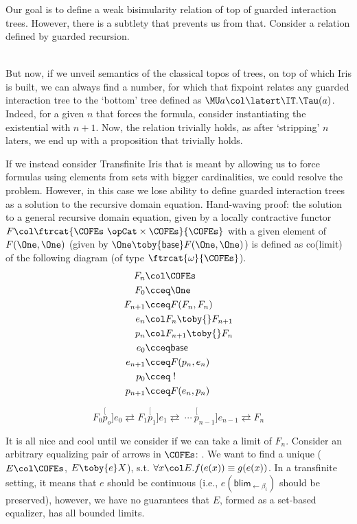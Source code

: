 Our goal is to define a weak bisimularity relation of top of guarded
interaction trees. However, there is a subtlety that prevents us from
that. Consider a relation defined by guarded recursion.

\begin{align*}
\end{align*}

But now, if we unveil semantics of the classical topos of trees,
on top of which Iris is built, we can always find a number, for
which that fixpoint relates any guarded interaction tree to
the `bottom' tree defined as $\MU a \col \latert \IT. \Tau(a)$.
Indeed, for a given $n$ that forces the formula, consider instantiating
the existential with $n + 1$. Now, the relation trivially holds, as after
`stripping' $n$ laters, we end up with a proposition that trivially holds.

If we instead consider Transfinite Iris that is meant by allowing us to
force formulas using elements from sets with bigger cardinalities, we
could resolve the problem. However, in this case we lose ability
to define guarded interaction trees as a solution to the recursive domain
equation. Hand-waving proof: the solution to a general recursive domain equation,
given by a locally contractive functor $F \col \ftrcat{\COFEs~\opCat \times \COFEs}{\COFEs}$ with a given element of $F(\One, \One)$ (given by $\One \toby{\mathsf{base}} F(\One, \One)$) is defined as co(limit) of
the following diagram (of type $\ftrcat{\omega}{\COFEs}$).
\begin{align*}
  F_n & \col \COFEs \\
  F_0 & \cceq \One \\
  F_{n + 1} & \cceq F(F_n, F_n) \\
  e_n & \col F_n \toby{} F_{n + 1} \\
  p_n & \col F_{n + 1} \toby{} F_n \\
  e_0 & \cceq \mathsf{base} \\
  e_{n + 1} & \cceq F(p_n, e_n) \\
  p_0 & \cceq \; ! \\
  p_{n + 1} & \cceq F(e_n, p_n)
\end{align*}

\[
  F_0 \stackrel[p_o]{e_0}{\rightleftarrows}
  F_1 \stackrel[p_1]{e_1}{\rightleftarrows}
  \ \cdots \
  \stackrel[p_{n - 1}]{e_{n - 1}}{\rightleftarrows} F_n
\]

It is all nice and cool until we consider if we can take a limit of
$F_n$. Consider an arbitrary equalizing pair of arrows in $\COFEs$:
\parpair{X}{Y}{f}{g}. We want to find a unique ($E \col \COFEs$, $E
\toby{e} X$), s.t. $\forall x \col E. f(e(x)) \equiv g(e(x))$. In a
transfinite setting, it means that $e$ should be continuous (i.e., $e
(\mathsf{blim}_{\leftarrow \beta_i})$ should be preserved), however,
we have no guarantees that $E$, formed as a set-based equalizer, has all
bounded limits.

